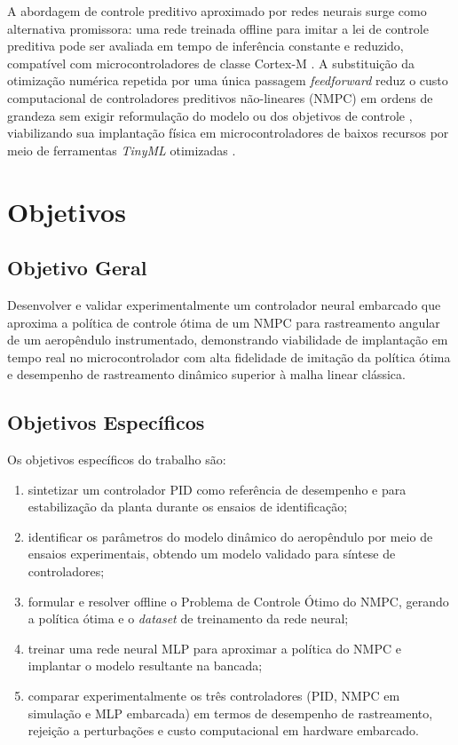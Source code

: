 A abordagem de controle preditivo aproximado por redes neurais surge como alternativa promissora: uma rede treinada offline para imitar a lei de controle preditiva pode ser avaliada em tempo de inferência constante e reduzido, compatível com microcontroladores de classe Cortex-M \cite{karg2020}. A substituição da otimização numérica repetida por uma única passagem \textit{feedforward} reduz o custo computacional de controladores preditivos não-lineares (NMPC) em ordens de grandeza sem exigir reformulação do modelo ou dos objetivos de controle \cite{nubert2020safe}, viabilizando sua implantação física em microcontroladores de baixos recursos por meio de ferramentas \textit{TinyML} otimizadas \cite{david2021}.

\section{Objetivos}
\label{sec:intro_objetivos}

\subsection{Objetivo Geral}

Desenvolver e validar experimentalmente um controlador neural embarcado que aproxima a política de controle ótima de um NMPC para rastreamento angular de um aeropêndulo instrumentado, demonstrando viabilidade de implantação em tempo real no microcontrolador com alta fidelidade de imitação da política ótima e desempenho de rastreamento dinâmico superior à malha linear clássica.

\subsection{Objetivos Específicos}

Os objetivos específicos do trabalho são:

\begin{enumerate}
    \item sintetizar um controlador PID como referência de desempenho e para estabilização da planta durante os ensaios de identificação;
    \item identificar os parâmetros do modelo dinâmico do aeropêndulo por meio de ensaios experimentais, obtendo um modelo validado para síntese de controladores;
    \item formular e resolver offline o Problema de Controle Ótimo do NMPC, gerando a política ótima e o \textit{dataset} de treinamento da rede neural;
    \item treinar uma rede neural MLP para aproximar a política do NMPC e implantar o modelo resultante na bancada;
    \item comparar experimentalmente os três controladores (PID, NMPC em simulação e MLP embarcada) em termos de desempenho de rastreamento, rejeição a perturbações e custo computacional em hardware embarcado.
\end{enumerate}
